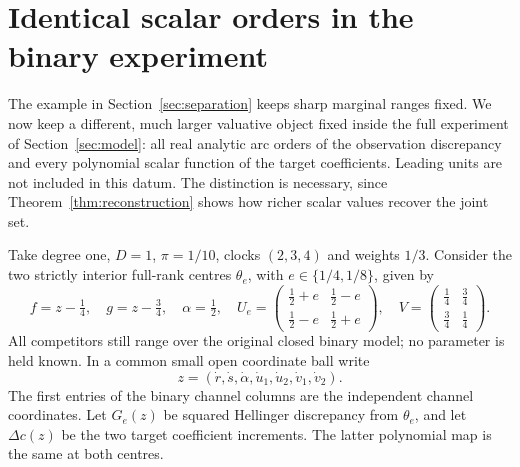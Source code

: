 \section{Identical scalar orders in the binary experiment}\label{sec:valuative}
The example in Section~\ref{sec:separation} keeps sharp marginal ranges
fixed. We now keep a different, much larger valuative object fixed inside
the full experiment of Section~\ref{sec:model}: all real analytic arc
orders of the observation discrepancy and every polynomial scalar
function of the target coefficients. Leading units are not included in
this datum. The distinction is necessary, since
Theorem~\ref{thm:reconstruction} shows how richer scalar values recover
the joint set.

Take degree one, $D=1$, $\pi=1/10$, clocks $(2,3,4)$ and weights $1/3$.
Consider the two strictly interior full-rank centres $\theta_e$, with
$e\in\{1/4,1/8\}$, given by
\begin{equation}\label{eq:binary-two-centres}
 f=z-\tfrac14,\quad g=z-\tfrac34,\quad \alpha=\tfrac12,
 \quad U_e=\begin{pmatrix}\frac12+e&\frac12-e\\
                          \frac12-e&\frac12+e\end{pmatrix},
 \quad V=\begin{pmatrix}\frac14&\frac34\\\frac34&\frac14\end{pmatrix}.
\end{equation}
All competitors still range over the original closed binary model; no
parameter is held known. In a common small open coordinate ball write
\[
 z=(\dot r,\dot s,\dot\alpha,\dot u_1,\dot u_2,
                     \dot v_1,\dot v_2).
\]
The first entries of the binary channel columns are the independent
channel coordinates. Let $G_e(z)$ be squared Hellinger discrepancy from
$\theta_e$, and let $\Delta c(z)$ be the two target coefficient
increments. The latter polynomial map is the same at both centres.

